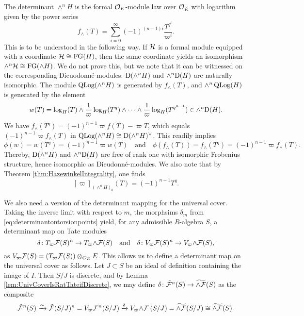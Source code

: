 \documentclass[../main.tex]{subfiles}
\begin{document}
\begin{xpl*}\label{xpl:DeterminantOfH}
  The determinant $\wedge^n H$ is the formal $\mathcal{O}_E$-module law over 
  $\mathcal{O}_{\breve {E}}$ with logarithm given by the power series
  \begin{equation*}
    f_\wedge(T) = \sum_{i=0}^\infty (-1)^{(n-1)i} \frac{T^{q^i}}{\varpi^i}.
  \end{equation*}
  This is to be understood in the following way. If $\mathcal{H}$ is a formal module
  equipped with a coordinate $\mathcal{H} \cong \textnormal{FG}(H)$, then the same coordinate yields 
  an isomorphism $\wedge^n \mathcal{H} \cong \textnormal{FG}(\wedge H)$. We do not prove this,
  but we note that it can be witnessed on the
  corresponding Dieuodonn\'e-modules: $\mathrm{D}(\wedge^n H)$ and 
  $\wedge^n \mathrm{D}(H)$ are naturally isomorphic. The module $\operatorname {QLog}(\wedge^n H)$
  is
  generated by $f_\wedge(T)$, and $\wedge^n \operatorname {QLog}(H)$ is generated by the element
  \begin{equation*}
    w(T) = \log_H(T) \wedge \frac 1\varpi \log_H(T^q) \wedge \dots \wedge \frac 1\varpi \log_H(T^{q^{n-1}}) \in \wedge^n \mathrm{D}(H).
  \end{equation*}
  We have $f_\wedge(T^q) = (-1)^{n-1} \varpi f(T) - \varpi T$, which equals
  $(-1)^{n-1}\varpi f_\wedge(T)$ in $\operatorname {QLog}(\wedge^n H) \cong \mathrm{D}(\wedge^n
  H)^\vee$. 
  This readily implies
  \begin{equation*}
    \phi(w) = w(T^q) = (-1)^{n-1} \varpi w(T) \quad \text{and} \quad
    \phi(f_\wedge(T)) = f_\wedge(T^q) = (-1)^{n-1}\varpi f_\wedge(T).
  \end{equation*}
  Thereby, $\mathrm{D}(\wedge^n H)$ and $\wedge^n \mathrm{D}(H)$ are free of rank one
  with isomorphic Frobenius structure, hence isomorphic as Dieudonn\'e-modules.
  We also note that by Theorem \ref{thm:HazewinkelIntegrality}, one finds
  \begin{equation} \label{eq:detformalmodulevarpiexpl}
    [\varpi]_{(\wedge^n H)_0}(T) = (-1)^{n-1} T^q.
  \end{equation}
\end{xpl*}

We also need a version of the determinant mapping for the universal cover. 
Taking the inverse limit with respect to $m$, the morphsims $\delta_m$ from
\eqref{eq:determinantontorsionpoints} yield, for any 
admissible $R$-algebra $S$, a determinant map on Tate modules
\begin{equation*}
  \delta \colon T_\varpi \mathcal{F} (S)^n \to T_\varpi {\wedge \mathcal{F}} (S) \quad \text{and} \quad
  \delta \colon V_\varpi \mathcal{F} (S)^n \to V_\varpi {\wedge \mathcal{F}} (S),
\end{equation*}
as $V_\varpi \mathcal{F}(S) = (T_\varpi \mathcal{F}(S))\otimes_{\mathcal{O}_E} E$. This allows us to define a 
determinant map on the universal cover as follows. Let $J \subset S$ be an ideal
of definition containing the image of $I$. Then
$S/J$ is discrete, and by Lemma \ref{lem:UnivCoverIsRatTateifDiscrete}, we may
define $\delta \colon \tilde {\mathcal{F}}^n(S) \to \widetilde {\wedge \mathcal{F}}(S)$
as the composite
\begin{equation*}
  \tilde {\mathcal{F}}^n(S) \xrightarrow{\sim} \tilde {\mathcal{F}}(S/J)^n = V_\varpi \mathcal{F}^n(S/J) 
  \xrightarrow{\delta} V_\varpi {\wedge \mathcal{F}}\, (S/J) = \widetilde {\wedge \mathcal{F}}(S/J) 
  \cong \widetilde {\wedge \mathcal{F}}(S).
\end{equation*}
\end{document}
